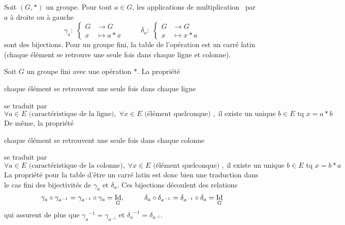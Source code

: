 \begin{prop}
  Soit $(G,*)$ un groupe. Pour tout $a\in G$, les applications de \og multiplication\fg~ par $a$ à droite ou à gauche 
\begin{displaymath}
  \gamma_a:\;\left\lbrace 
  \begin{aligned}
    G &\rightarrow G \\ x &\mapsto a*x
  \end{aligned}
\right. \hspace{1cm}
  \delta_a:\;\left\lbrace 
  \begin{aligned}
    G &\rightarrow G \\ x &\mapsto x*a
  \end{aligned}
\right.
\end{displaymath}
  sont des bijections. Pour un groupe fini, la table de l'opération est un carré latin  (chaque élément se retrouve une seule fois dans chaque ligne et colonne).
\end{prop}
\begin{demo}
  Soit $G$ un groupe fini avec une opération $*$. La propriété 
\begin{center}
  \og chaque élément se retrouvent une seule fois dans chaque ligne\fg
\end{center}
se traduit par 
\begin{displaymath}
  \forall a\in E \text{ (caractéristique de la ligne)},\; \forall x \in E \text{ (élément quelconque) },\; \text{il existe un unique }b\in E\text{ tq } x = a*b
\end{displaymath}
De même, la propriété 
\begin{center}
  \og chaque élément se retrouvent une seule fois dans chaque colonne\fg
\end{center}
se traduit par 
\begin{displaymath}
  \forall a\in E \text{ (caractéristique de la colonne)},\; \forall x \in E \text{ (élément quelconque) },\; \text{il existe un unique }b\in E\text{ tq } x = b*a
\end{displaymath}
La propriété pour la table d'être un carré latin est donc bien une traduction dans le cas fini des bijectivités de $\gamma_a$ et $\delta_a$.  Ces bijections découlent des relations
\begin{displaymath}
  \gamma_a \circ \gamma_{a^{-1}} = \gamma_{a^{-1}} \circ \gamma_a = \mathop{\mathrm{Id}}_G, \hspace{1cm}
  \delta_a \circ \delta_{a^{-1}} = \delta_{a^{-1}} \circ \delta_a = \mathop{\mathrm{Id}}_G
\end{displaymath}
qui assurent de plus que ${\gamma_a}^{-1} = \gamma_{a^{-1}}$ et ${\delta_a}^{-1} = \delta_{a^{-1}}$.
\end{demo}
